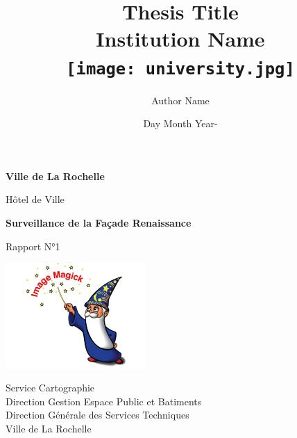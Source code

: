 
\title{
    {Thesis Title}\\
    {\large Institution Name}\\
    {\texttt{[image: university.jpg]}}
}
\author{Author Name}
\date{Day Month Year}


\begin{titlepage}
  \begin{center}
    \vspace*{1cm}

    \Huge
    \textbf{Ville de La Rochelle}

    \vspace{0.5cm}
    \LARGE
    Hôtel de Ville

    \vspace{1.5cm}

    \textbf{Surveillance de la Façade Renaissance}

    \vfill

    Rapport N°1

    \vspace{0.8cm}

    \includegraphics[viewport=0 0 400 300,bb=0 0 0 0,width=0.4\textwidth]{test.jpg}

    \Large
    Service Cartographie\\
    Direction Gestion Espace Public et Batiments\\
    Direction Générale des Services Techniques\\
    Ville de La Rochelle\\
    \date{-}

  \end{center}
\end{titlepage}

